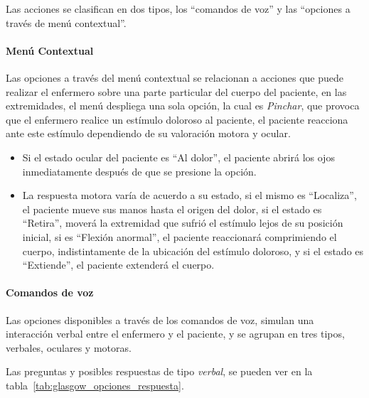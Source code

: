 Las acciones se clasifican en dos tipos, los \enquote{comandos de voz} y las
\enquote{opciones a través de menú contextual}. 

\paragraph{Menú Contextual}

Las opciones a través del menú contextual se relacionan a acciones que puede
realizar el enfermero sobre una parte particular del cuerpo del paciente, en las
extremidades, el menú despliega una sola opción, la cual es \emph{Pinchar}, que
provoca que el enfermero realice un estímulo doloroso al paciente, el
paciente reacciona ante este estímulo dependiendo de su valoración motora y
ocular. 

\begin{itemize}
    \item Si el estado ocular del paciente es \enquote{Al dolor}, el paciente
        abrirá los ojos inmediatamente después de que se presione la opción. 
    \item  La respuesta motora varía de acuerdo a su estado, si el mismo es
        \enquote{Localiza}, el paciente mueve sus manos hasta el origen del
        dolor, si el estado es \enquote{Retira}, moverá la extremidad que
        sufrió el estímulo lejos de su posición inicial, si es
        \enquote{Flexión anormal}, el paciente reaccionará comprimiendo el
        cuerpo, indistintamente de la ubicación del estímulo doloroso, y si el
        estado es \enquote{Extiende}, el paciente extenderá el cuerpo.
\end{itemize}

\paragraph{Comandos de voz}

Las opciones disponibles a través de los comandos de voz, simulan una
interacción verbal entre el enfermero y el paciente, y se agrupan en tres
tipos, verbales, oculares y motoras.

Las preguntas y posibles respuestas de tipo \emph{verbal}, se pueden ver en la
tabla~\ref{tab:glasgow_opciones_respuesta}. 

